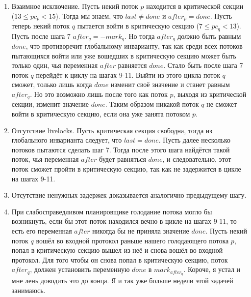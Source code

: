 \documentclass{article}
\begin{document}
\begin{enumerate}
    \item Взаимное исключение. Пусть некий поток $ p $ находится в критической секции ($ 13 \leq pc_p < 15 $). Тогда мы
    знаем, что $ last \neq done $ и $ after_p = done $. Пусть теперь некий поток $ q $ пытается войти в критическую
    секцию ($ 7 \leq pc_q < 13 $). Пусть после шага 7 $ after_q = -mark_q $. Но тогда $ after_q $ должно быть равным
    $ done $, что противоречит глобальному инварианту, так как среди всех потоков пытающихся войти или уже вошедших в
    критическую секцию может быть только один, чья переменная $ after $ равняется $ done $. Стало быть после шага 7
    поток $ q $ перейдёт к циклу на шагах 9-11. Выйти из этого цикла поток $ q $ сможет, только лишь когда $ done $
    изменит своё значение и станет равным $ after_q $. Но это возможно лишь после того как поток $ p $, выходя из
    критической секции, изменит значение $ done $. Таким образом никакой поток $ q $ не сможет войти в критическую
    секцию, если она уже занята потоком $ p $.
    \item Отсутствие livelocks. Пусть критическая секция свободна, тогда из глобального инварианта следует, что
    $ last = done $. Пусть далее несколько потоков пытаются сделать шаг 7. Тогда после этого шага найдётся такой поток,
    чья переменная $ after $ будет равняться $ done $, и следовательно, этот поток сможет пройти в критическую секцию,
    так как не задержится в цикле на шагах 9-11.
    \item Отсутствие ненужных задержек доказывается аналогично предыдущему шагу.
    \item При слабосправедливом планировщике голодание потока могло бы возникнуть, если бы этот поток находился вечно в
    цикле на шагах 9-11, то есть его переменная $ after $ никогда бы не приняла значение $ done $.  Пусть некий поток
    $ q $ вошёл во входной протокол раньше нашего голодающего потока $ p $, попал в критическую секцию вышел из неё и
    снова вошёл во входной протокол. Для того чтобы он снова попал в критическую секцию, поток $ after_q $, должен
    установить переменную $ done $ в $ mark_{after_q} $. Короче, я устал и мне лень доводить это до конца. Я и так уже
    больше недели этой задачей занимаюсь.
\end{enumerate}
\end{document}
